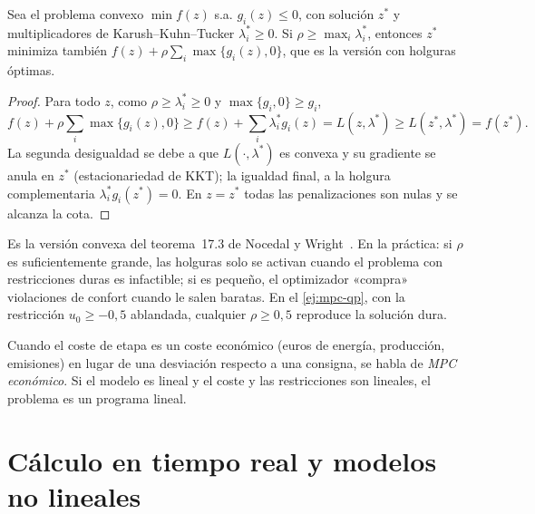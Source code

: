 \begin{proposicion}\label{prop:exacta}
Sea el problema convexo $\min f(z)$ s.a. $g_i(z)\le0$, con solución $z^{*}$ y multiplicadores de Karush--Kuhn--Tucker $\lambda_i^{*}\ge0$. Si $\rho\ge\max_i\lambda_i^{*}$, entonces $z^{*}$ minimiza también $f(z)+\rho\sum_i\max\{g_i(z),0\}$, que es la versión con holguras óptimas.
\end{proposicion}

\begin{proof}
Para todo $z$, como $\rho\ge\lambda_i^{*}\ge0$ y $\max\{g_i,0\}\ge g_i$,
\[
f(z)+\rho\sum_i\max\{g_i(z),0\}\ge f(z)+\sum_i\lambda_i^{*}g_i(z)=L(z,\lambda^{*})\ge L(z^{*},\lambda^{*})=f(z^{*}).
\]
La segunda desigualdad se debe a que $L(\cdot,\lambda^{*})$ es convexa y su gradiente se anula en $z^{*}$ (estacionariedad de KKT); la igualdad final, a la holgura complementaria $\lambda_i^{*}g_i(z^{*})=0$. En $z=z^{*}$ todas las penalizaciones son nulas y se alcanza la cota.
\end{proof}

Es la versión convexa del teorema~17.3 de Nocedal y Wright~\cite[§17.2]{nw}. En la práctica: si $\rho$ es suficientemente grande, las holguras solo se activan cuando el problema con restricciones duras es infactible; si es pequeño, el optimizador «compra» violaciones de confort cuando le salen baratas. En el \cref{ej:mpc-qp}, con la restricción $u_0\ge-0{,}5$ ablandada, cualquier $\rho\ge0{,}5$ reproduce la solución dura.

\begin{definicion}\label{def:empc}
Cuando el coste de etapa es un coste económico (euros de energía, producción, emisiones) en lugar de una desviación respecto a una consigna, se habla de \emph{MPC económico}. Si el modelo es lineal y el coste y las restricciones son lineales, el problema es un programa lineal.
\end{definicion}

\section{Cálculo en tiempo real y modelos no lineales}

